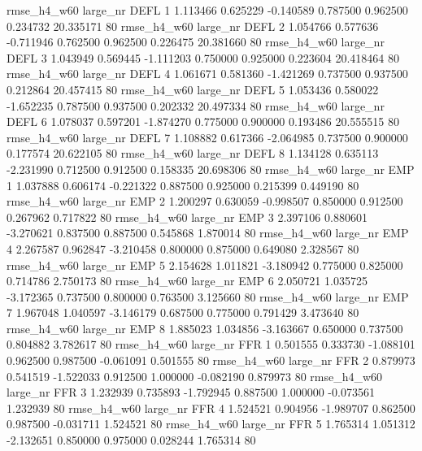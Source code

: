  rmse_h4_w60   large_nr     DEFL                 1  1.113466  0.625229  -0.140589 0.787500 0.962500  0.234732   20.335171 80
 rmse_h4_w60   large_nr     DEFL                 2  1.054766  0.577636  -0.711946 0.762500 0.962500  0.226475   20.381660 80
 rmse_h4_w60   large_nr     DEFL                 3  1.043949  0.569445  -1.111203 0.750000 0.925000  0.223604   20.418464 80
 rmse_h4_w60   large_nr     DEFL                 4  1.061671  0.581360  -1.421269 0.737500 0.937500  0.212864   20.457415 80
 rmse_h4_w60   large_nr     DEFL                 5  1.053436  0.580022  -1.652235 0.787500 0.937500  0.202332   20.497334 80
 rmse_h4_w60   large_nr     DEFL                 6  1.078037  0.597201  -1.874270 0.775000 0.900000  0.193486   20.555515 80
 rmse_h4_w60   large_nr     DEFL                 7  1.108882  0.617366  -2.064985 0.737500 0.900000  0.177574   20.622105 80
 rmse_h4_w60   large_nr     DEFL                 8  1.134128  0.635113  -2.231990 0.712500 0.912500  0.158335   20.698306 80
 rmse_h4_w60   large_nr      EMP                 1  1.037888  0.606174  -0.221322 0.887500 0.925000  0.215399    0.449190 80
 rmse_h4_w60   large_nr      EMP                 2  1.200297  0.630059  -0.998507 0.850000 0.912500  0.267962    0.717822 80
 rmse_h4_w60   large_nr      EMP                 3  2.397106  0.880601  -3.270621 0.837500 0.887500  0.545868    1.870014 80
 rmse_h4_w60   large_nr      EMP                 4  2.267587  0.962847  -3.210458 0.800000 0.875000  0.649080    2.328567 80
 rmse_h4_w60   large_nr      EMP                 5  2.154628  1.011821  -3.180942 0.775000 0.825000  0.714786    2.750173 80
 rmse_h4_w60   large_nr      EMP                 6  2.050721  1.035725  -3.172365 0.737500 0.800000  0.763500    3.125660 80
 rmse_h4_w60   large_nr      EMP                 7  1.967048  1.040597  -3.146179 0.687500 0.775000  0.791429    3.473640 80
 rmse_h4_w60   large_nr      EMP                 8  1.885023  1.034856  -3.163667 0.650000 0.737500  0.804882    3.782617 80
 rmse_h4_w60   large_nr      FFR                 1  0.501555  0.333730  -1.088101 0.962500 0.987500 -0.061091    0.501555 80
 rmse_h4_w60   large_nr      FFR                 2  0.879973  0.541519  -1.522033 0.912500 1.000000 -0.082190    0.879973 80
 rmse_h4_w60   large_nr      FFR                 3  1.232939  0.735893  -1.792945 0.887500 1.000000 -0.073561    1.232939 80
 rmse_h4_w60   large_nr      FFR                 4  1.524521  0.904956  -1.989707 0.862500 0.987500 -0.031711    1.524521 80
 rmse_h4_w60   large_nr      FFR                 5  1.765314  1.051312  -2.132651 0.850000 0.975000  0.028244    1.765314 80
